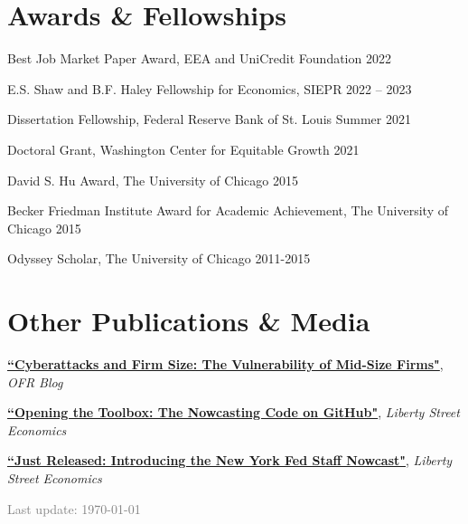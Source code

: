 \documentclass[margin,line]{res}                          %
\newenvironment{list1}{
	\begin{list}{\ding{113}}{%
			\setlength{\itemsep}{0in}
			\setlength{\parsep}{0in} \setlength{\parskip}{0in}
			\setlength{\topsep}{0in} \setlength{\partopsep}{0in}
			\setlength{\leftmargin}{0.17in}}}{\end{list}}
\begin{document}
\begin{resume}
	
	\section{\sc Awards \& Fellowships}
	\begin{list1}
		\item[] Best Job Market Paper Award, EEA and UniCredit Foundation
		\hfill 2022\smallskip
		\item[] E.S. Shaw and B.F. Haley Fellowship for Economics, SIEPR \hfill 2022 -- 2023\smallskip
		\item[] Dissertation Fellowship, Federal Reserve Bank of St. Louis  \hfill Summer 2021\smallskip
		\item[] Doctoral Grant, Washington Center for Equitable Growth \hfill 2021\smallskip
		\item[] David S. Hu Award, The University of Chicago \hfill 2015\smallskip
		\item[] Becker Friedman Institute Award for Academic Achievement, The University of Chicago \hfill 2015\smallskip
		\item[] Odyssey Scholar, The University of Chicago \hfill 2011-2015\smallskip
	\end{list1}
	
	\section{\sc Other Publications \& Media} 
	\begin{list1}
		\item[] \href{https://www.financialresearch.gov/the-ofr-blog/2025/09/18/cyberattack-firm-size-vulnerability-mid-size-firms/}{\textbf{``Cyberattacks and Firm Size: The Vulnerability of Mid-Size Firms"}}, \textit{{OFR Blog}}  \smallskip
		\item[] \href{https://libertystreeteconomics.newyorkfed.org/2018/08/opening-the-toolbox-the-nowcasting-code-on-github/}{\textbf{``Opening the Toolbox: The Nowcasting Code on GitHub"}}, \textit{{Liberty Street Economics}}  \smallskip
		\item[] \href{https://libertystreeteconomics.newyorkfed.org/2016/04/just-released-introducing-the-frbny-nowcast/}{\textbf{``Just Released: Introducing the New York Fed Staff Nowcast"}}, \textit{{Liberty Street Economics}} \smallskip            
	\end{list1}
	\vfill
	\hfill \textcolor{gray}{Last update: \today} 
	
	

\end{resume}
\end{document}
